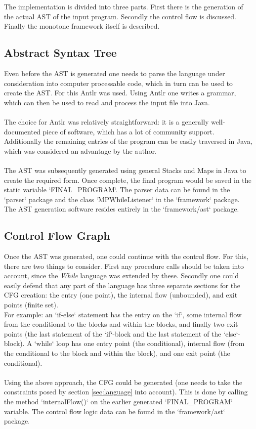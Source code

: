 \documentclass[paper=a4, fontsize=11pt]{scrartcl} %
\numberwithin{equation}{section} %
\numberwithin{figure}{section} %
\numberwithin{table}{section} %
\begin{document}
The implementation is divided into three parts.
First there is the generation of the actual AST of the input program.
Secondly the control flow is discussed.
Finally the monotone framework itself is described.

\subsection{Abstract Syntax Tree}

Even before the AST is generated one needs to parse the language under consideration into computer processable code, which in turn can be used to create the AST.
For this Antlr \cite{antlr} was used.
Using Antlr one writes a grammar, which can then be used to read and process the input file into Java.
\\
\\
The choice for Antlr was relatively straightforward:
it is a generally well-documented piece of software, which has a lot of community support.
Additionally the remaining entries of the program can be easily traversed in Java,
which was considered an advantage by the author.
\\
\\
The AST was subsequently generated using general Stacks and Maps in Java to create the required form.
Once complete, the final program would be saved in the static variable `FINAL\_PROGRAM`.
The parser data can be found in the `parser` package and the class `MPWhileListener` in the `framework` package.
The AST generation software resides entirely in the `framework/ast` package.

\subsection{Control Flow Graph}

Once the AST was generated, one could continue with the control flow.
For this, there are two things to consider.
First any procedure calls should be taken into account, since the \textit{While} language was extended by these.
Secondly one could easily defend that any part of the language has three separate sections for the CFG creation:
the entry (one point),
the internal flow (unbounded),
and exit points (finite set).
\\
For example: an `if-else` statement has the entry on the `if`, some internal flow from the conditional to the blocks and within the blocks, and finally two exit points (the last statement of the `if`-block and the last statement of the `else`-block).
A `while` loop has one entry point (the conditional), internal flow (from the conditional to the block and within the block), and one exit point (the conditional).
\\
\\
Using the above approach, the CFG could be generated (one needs to take the constraints posed by section \ref{sec:language} into account).
This is done by calling the method `internalFlow()` on the earlier generated `FINAL\_PROGRAM` variable.
The control flow logic data can be found in the `framework/ast` package.
\end{document}
